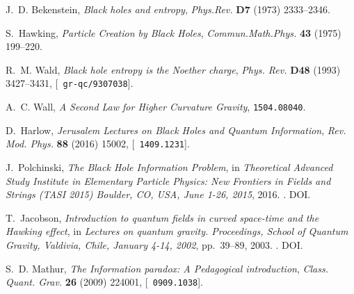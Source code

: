 \documentclass[10pt]{article}
\begin{document}
\providecommand{\href}[2]{#2}\begingroup\raggedright
\begin{thebibliography}{100}

J.~D. Bekenstein, \emph{{Black holes and entropy}},
  \href{http://dx.doi.org/10.1103/PhysRevD.7.2333}{\emph{Phys.Rev.} {\bf D7}
  (1973) 2333--2346}.

S.~Hawking, \emph{{Particle Creation by Black Holes}},
  \href{http://dx.doi.org/10.1007/BF02345020}{\emph{Commun.Math.Phys.} {\bf 43}
  (1975) 199--220}.

R.~M. Wald, \emph{{Black hole entropy is the Noether charge}},
  \href{http://dx.doi.org/10.1103/PhysRevD.48.R3427}{\emph{Phys. Rev.} {\bf
  D48} (1993) 3427--3431}, [\href{http://arxiv.org/abs/gr-qc/9307038}{{\tt
  gr-qc/9307038}}].

A.~C. Wall, \emph{{A Second Law for Higher Curvature Gravity}},
  \href{http://arxiv.org/abs/1504.08040}{{\tt 1504.08040}}.

D.~Harlow, \emph{{Jerusalem Lectures on Black Holes and Quantum Information}},
  \href{http://dx.doi.org/10.1103/RevModPhys.88.015002}{\emph{Rev. Mod. Phys.}
  {\bf 88} (2016) 15002}, [\href{http://arxiv.org/abs/1409.1231}{{\tt
  1409.1231}}].

J.~Polchinski, \emph{{The Black Hole Information Problem}},  in
  \emph{{Theoretical Advanced Study Institute in Elementary Particle Physics:
  New Frontiers in Fields and Strings (TASI 2015) Boulder, CO, USA, June 1-26,
  2015}}, 2016.
\newblock \href{http://arxiv.org/abs/1609.04036}{{\tt 1609.04036}}.
\newblock \href{http://dx.doi.org/10.1142/9789813149441_0006}{DOI}.

T.~Jacobson, \emph{{Introduction to quantum fields in curved space-time and the
  Hawking effect}},  in \emph{{Lectures on quantum gravity. Proceedings, School
  of Quantum Gravity, Valdivia, Chile, January 4-14, 2002}}, pp.~39--89, 2003.
\newblock \href{http://arxiv.org/abs/gr-qc/0308048}{{\tt gr-qc/0308048}}.
\newblock \href{http://dx.doi.org/10.1007/0-387-24992-3_2}{DOI}.

S.~D. Mathur, \emph{{The Information paradox: A Pedagogical introduction}},
  \href{http://dx.doi.org/10.1088/0264-9381/26/22/224001}{\emph{Class. Quant.
  Grav.} {\bf 26} (2009) 224001}, [\href{http://arxiv.org/abs/0909.1038}{{\tt
  0909.1038}}].


\end{thebibliography}
\end{document}
